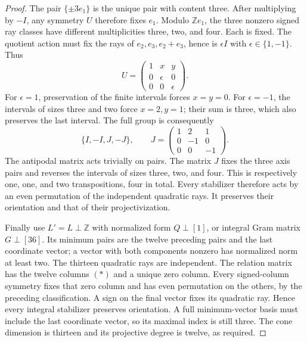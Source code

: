\documentclass[11pt,a4paper]{article}
\theoremstyle{definition}
\begin{document}
\begin{proof}
The pair $\{\pm3e_1\}$ is the unique pair with content three.
After multiplying by $-I$, any symmetry $U$ therefore fixes $e_1$.
Modulo $\mathbb Ze_1$, the three nonzero signed ray classes have
different multiplicities three, two, and four. Each is fixed.
The quotient action must fix the rays of $e_2,e_3,e_2+e_3$, hence is
$\epsilon I$ with $\epsilon\in\{1,-1\}$. Thus
\[
 U=\begin{pmatrix}1&x&y\\0&\epsilon&0\\0&0&\epsilon\end{pmatrix}.
\]
For $\epsilon=1$, preservation of the finite intervals forces $x=y=0$.
For $\epsilon=-1$, the intervals of sizes three and two force
$x=2,y=1$; their sum is three, which also preserves the last interval.
The full group is consequently
\[
 \{I,-I,J,-J\},\qquad
 J=\begin{pmatrix}1&2&1\\0&-1&0\\0&0&-1\end{pmatrix}.
\]
The antipodal matrix acts trivially on pairs. The matrix $J$ fixes the
three axis pairs and reverses the intervals of sizes three, two, and
four. This is respectively one, one, and two transpositions, four
in total. Every stabilizer therefore acts by an even permutation of
the independent quadratic rays. It preserves their orientation and
that of their projectivization.

Finally use $L'=L\perp\mathbb Z$ with normalized form $Q\perp[1]$,
or integral Gram matrix $G\perp[36]$. Its minimum pairs are the
twelve preceding pairs and the last coordinate vector; a vector
with both components nonzero has normalized norm at least two.
The thirteen quadratic rays are independent. The relation matrix
has the twelve columns $(\ast)$ and a unique zero column.
Every signed-column symmetry fixes that zero column and has even
permutation on the others, by the preceding classification. A sign
on the final vector fixes its quadratic ray. Hence every integral
stabilizer preserves orientation. A full minimum-vector basis must
include the last coordinate vector, so its maximal index is still
three. The cone dimension is thirteen and its projective degree is
twelve, as required.
\end{proof}
\end{document}
